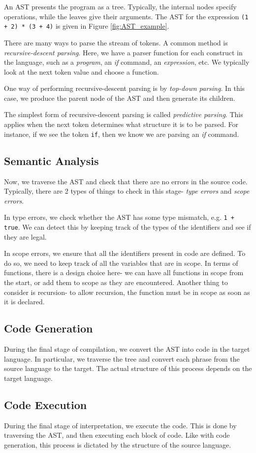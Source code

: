 An AST presents the program as a tree. Typically, the internal nodes specify operations, while the leaves give their arguments. The AST for the expression \texttt{(1 + 2) * (3 + 4)} is given in Figure \ref{fig:AST_example}.

There are many ways to parse the stream of tokens. A common method is \emph{recursive-descent parsing}. Here, we have a parser function for each construct in the language, such as a \textit{program}, an \textit{if} command, an \textit{expression}, etc. We typically look at the next token value and choose a function. 

One way of performing recursive-descent parsing is by \emph{top-down parsing}. In this case, we produce the parent node of the AST and then generate its children. 

The simplest form of recursive-descent parsing is called \emph{predictive parsing}. This applies when the next token determines what structure it is to be parsed. For instance, if we see the token \texttt{if}, then we know we are parsing an \textit{if} command.

\subsection{Semantic Analysis}
Now, we traverse the AST and check that there are no errors in the source code. Typically, there are 2 types of things to check in this stage- \emph{type errors} and \emph{scope errors}. 

In type errors, we check whether the AST has some type mismatch, e.g. \texttt{1 + true}. We can detect this by keeping track of the types of the identifiers and see if they are legal.

In scope errors, we ensure that all the identifiers present in code are defined. To do so, we need to keep track of all the variables that are in scope. In terms of functions, there is a design choice here- we can have all functions in scope from the start, or add them to scope as they are encountered. Another thing to consider is recursion- to allow recursion, the function must be in scope as soon as it is declared.

\subsection{Code Generation}
During the final stage of compilation, we convert the AST into code in the target language. In particular, we traverse the tree and convert each phrase from the source language to the target. The actual structure of this process depends on the target language.

\subsection{Code Execution}
During the final stage of interpretation, we execute the code. This is done by traversing the AST, and then executing each block of code. Like with code generation, this process is dictated by the structure of the source language.
